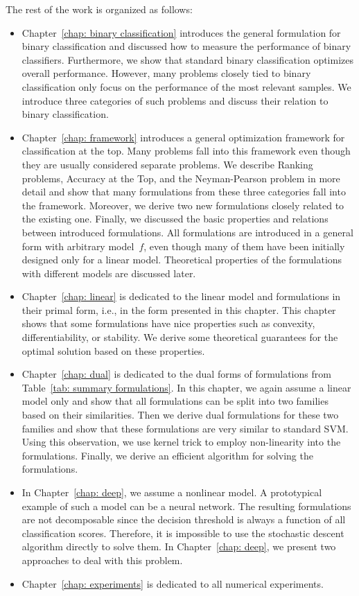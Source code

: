 The rest of the work is organized as follows:
\begin{itemize}
  \item Chapter~\ref{chap: binary classification} introduces the general formulation for binary classification and discussed how to measure the performance of binary classifiers. Furthermore, we show that standard binary classification optimizes overall performance. However, many problems closely tied to binary classification only focus on the performance of the most relevant samples. We introduce three categories of such problems and discuss their relation to binary classification.
  \item Chapter~\ref{chap: framework} introduces a general optimization framework for classification at the top. Many problems fall into this framework even though they are usually considered separate problems. We describe Ranking problems, Accuracy at the Top, and the Neyman-Pearson problem in more detail and show that many formulations from these three categories fall into the framework. Moreover, we derive two new formulations closely related to the existing one. Finally, we discussed the basic properties and relations between introduced formulations. All formulations are introduced in a general form with arbitrary model~$f$, even though many of them have been initially designed only for a linear model. Theoretical properties of the formulations with different models are discussed later.
  \item Chapter~\ref{chap: linear} is dedicated to the linear model and formulations in their primal form, i.e., in the form presented in this chapter. This chapter shows that some formulations have nice properties such as convexity, differentiability, or stability. We derive some theoretical guarantees for the optimal solution based on these properties.
  \item Chapter~\ref{chap: dual} is dedicated to the dual forms of formulations from Table~\ref{tab: summary formulations}. In this chapter, we again assume a linear model only and show that all formulations can be split into two families based on their similarities. Then we derive dual formulations for these two families and show that these formulations are very similar to standard SVM. Using this observation, we use kernel trick to employ non-linearity into the formulations. Finally, we derive an efficient algorithm for solving the formulations.
  \item In Chapter~\ref{chap: deep}, we assume a nonlinear model. A prototypical example of such a model can be a neural network. The resulting formulations are not decomposable since the decision threshold is always a function of all classification scores. Therefore, it is impossible to use the stochastic descent algorithm directly to solve them. In Chapter~\ref{chap: deep}, we present two approaches to deal with this problem.
  \item Chapter~\ref{chap: experiments} is dedicated to all numerical experiments.
\end{itemize}
